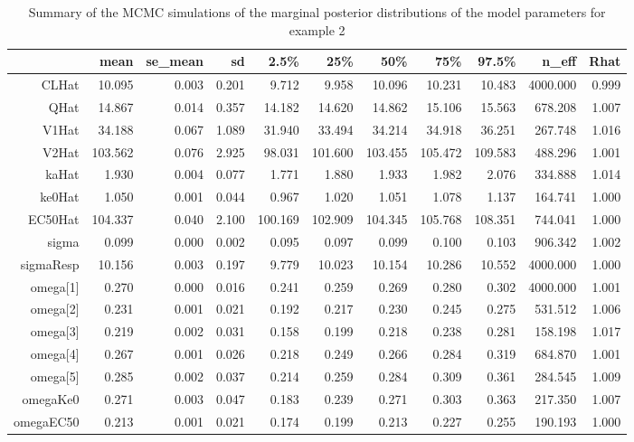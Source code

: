 \documentclass[11pt]{amsart}
\begin{document}
\begin{table}[ht]
\centering
\caption{Summary of the MCMC simulations of the marginal posterior distributions of the model parameters for example 2}
\begin{tabular}{rrrrrrrrrrr}
  \hline
 & mean & se\_mean & sd & 2.5\% & 25\% & 50\% & 75\% & 97.5\% & n\_eff & Rhat \\ 
  \hline
CLHat & 10.095 & 0.003 & 0.201 & 9.712 & 9.958 & 10.096 & 10.231 & 10.483 & 4000.000 & 0.999 \\
QHat & 14.867 & 0.014 & 0.357 & 14.182 & 14.620 & 14.862 & 15.106 & 15.563 & 678.208 & 1.007 \\
V1Hat & 34.188 & 0.067 & 1.089 & 31.940 & 33.494 & 34.214 & 34.918 & 36.251 & 267.748 & 1.016 \\
V2Hat & 103.562 & 0.076 & 2.925 & 98.031 & 101.600 & 103.455 & 105.472 & 109.583 & 488.296 & 1.001 \\
kaHat & 1.930 & 0.004 & 0.077 & 1.771 & 1.880 & 1.933 & 1.982 & 2.076 & 334.888 & 1.014 \\
ke0Hat & 1.050 & 0.001 & 0.044 & 0.967 & 1.020 & 1.051 & 1.078 & 1.137 & 164.741 & 1.000 \\
EC50Hat & 104.337 & 0.040 & 2.100 & 100.169 & 102.909 & 104.345 & 105.768 & 108.351 & 744.041 & 1.000 \\
sigma & 0.099 & 0.000 & 0.002 & 0.095 & 0.097 & 0.099 & 0.100 & 0.103 & 906.342 & 1.002 \\
sigmaResp & 10.156 & 0.003 & 0.197 & 9.779 & 10.023 & 10.154 & 10.286 & 10.552 & 4000.000 & 1.000 \\
omega[1] & 0.270 & 0.000 & 0.016 & 0.241 & 0.259 & 0.269 & 0.280 & 0.302 & 4000.000 & 1.001 \\
omega[2] & 0.231 & 0.001 & 0.021 & 0.192 & 0.217 & 0.230 & 0.245 & 0.275 & 531.512 & 1.006 \\
omega[3] & 0.219 & 0.002 & 0.031 & 0.158 & 0.199 & 0.218 & 0.238 & 0.281 & 158.198 & 1.017 \\
omega[4] & 0.267 & 0.001 & 0.026 & 0.218 & 0.249 & 0.266 & 0.284 & 0.319 & 684.870 & 1.001 \\
omega[5] & 0.285 & 0.002 & 0.037 & 0.214 & 0.259 & 0.284 & 0.309 & 0.361 & 284.545 & 1.009 \\
omegaKe0 & 0.271 & 0.003 & 0.047 & 0.183 & 0.239 & 0.271 & 0.303 & 0.363 & 217.350 & 1.007 \\
omegaEC50 & 0.213 & 0.001 & 0.021 & 0.174 & 0.199 & 0.213 & 0.227 & 0.255 & 190.193 & 1.000 \\
  \hline
\end{tabular}
\end{table}
\end{document}
